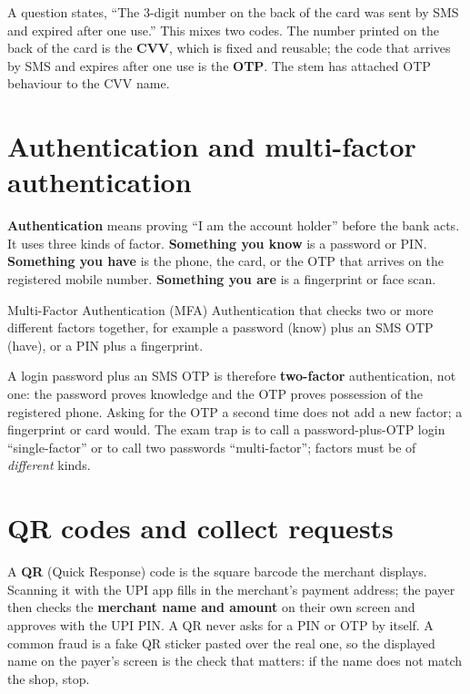 \begin{example}
A question states, ``The 3-digit number on the back of the card was sent by
SMS and expired after one use.'' This mixes two codes. The number printed on
the back of the card is the \textbf{CVV}, which is fixed and reusable; the
code that arrives by SMS and expires after one use is the \textbf{OTP}. The
stem has attached OTP behaviour to the CVV name.
\end{example}

\section{Authentication and multi-factor authentication}
\textbf{Authentication} means proving ``I am the account holder'' before the
bank acts. It uses three kinds of factor. \textbf{Something you know} is a
password or PIN. \textbf{Something you have} is the phone, the card, or the
OTP that arrives on the registered mobile number. \textbf{Something you are}
is a fingerprint or face scan.

\begin{definitionbox}{Multi-Factor Authentication (MFA)}
Authentication that checks two or more different factors together, for
example a password (know) plus an SMS OTP (have), or a PIN plus a
fingerprint.
\end{definitionbox}

A login password plus an SMS OTP is therefore \textbf{two-factor}
authentication, not one: the password proves knowledge and the OTP proves
possession of the registered phone. Asking for the OTP a second time does
not add a new factor; a fingerprint or card would. The exam trap is to call a
password-plus-OTP login ``single-factor'' or to call two passwords
``multi-factor''; factors must be of \emph{different} kinds.

\section{QR codes and collect requests}
A \textbf{QR} (Quick Response) code is the square barcode the merchant
displays. Scanning it with the UPI app fills in the merchant's payment
address; the payer then checks the \textbf{merchant name and amount} on
their own screen and approves with the UPI PIN. A QR never asks for a PIN or
OTP by itself. A common fraud is a fake QR sticker pasted over the real one,
so the displayed name on the payer's screen is the check that matters: if
the name does not match the shop, stop.

